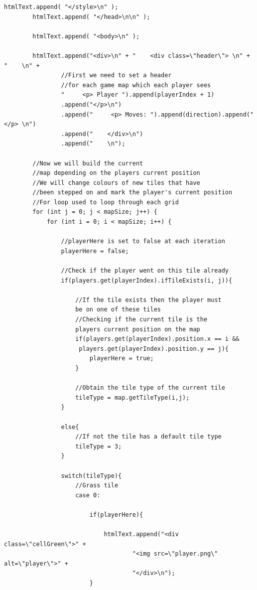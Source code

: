 \documentclass[a4paper,12pt]{extarticle}
\begin{document}
\begin{lstlisting}[caption=The initial code of the Game class, label=amb]
        htmlText.append( "</style>\n" );
        htmlText.append( "</head>\n\n" );

        htmlText.append( "<body>\n" );

        htmlText.append("<div>\n" + "    <div class=\"header\"> \n" + "    \n" +
                //First we need to set a header 
                //for each game map which each player sees
                "     <p> Player ").append(playerIndex + 1)
                .append("</p>\n")
                .append("     <p> Moves: ").append(direction).append(" </p> \n")
                .append("    </div>\n")
                .append("    \n");

        //Now we will build the current 
        //map depending on the players current position
        //We will change colours of new tiles that have 
        //been stepped on and mark the player's current position
        //For loop used to loop through each grid
        for (int j = 0; j < mapSize; j++) {
            for (int i = 0; i < mapSize; i++) {

                //playerHere is set to false at each iteration
                playerHere = false;

                //Check if the player went on this tile already
                if(players.get(playerIndex).ifTileExists(i, j)){

                    //If the tile exists then the player must 
                    be on one of these tiles
                    //Checking if the current tile is the 
                    players current position on the map
                    if(players.get(playerIndex).position.x == i &&
                     players.get(playerIndex).position.y == j){
                        playerHere = true;
                    }

                    //Obtain the tile type of the current tile
                    tileType = map.getTileType(i,j);
                }

                else{
                    //If not the tile has a default tile type
                    tileType = 3;
                }

                switch(tileType){
                    //Grass tile
                    case 0:

                        if(playerHere){

                            htmlText.append("<div class=\"cellGreen\">" +
                                    "<img src=\"player.png\" alt=\"player\">" +
                                    "</div>\n");
                        }


\end{lstlisting}
\end{document}
